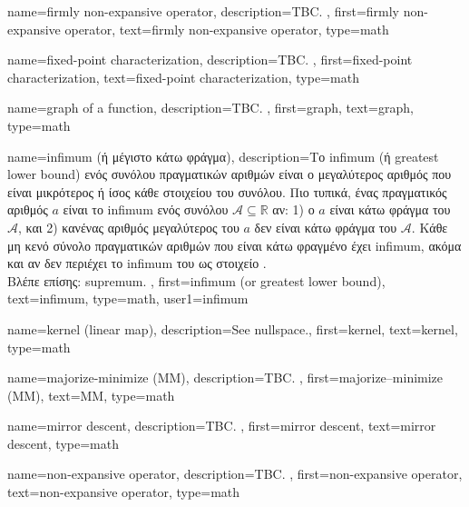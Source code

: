 {name={firmly non-expansive operator},
 	description={TBC. },
	first={firmly non-expansive operator},
 	text={firmly non-expansive operator},
	type=math
}

{name={fixed-point characterization},
	description={TBC. },
	first={fixed-point characterization},
	text={fixed-point characterization},
	type=math
}%

{name={graph of a function},
	description={TBC. }, 
	first={graph},
	text={graph},
	type=math
}

{name={infimum \foreignlanguage{greek}{(ή μέγιστο κάτω φράγμα)}},
	description={\foreignlanguage{greek}{Το} infimum 
		(\foreignlanguage{greek}{ή} greatest lower bound) \foreignlanguage{greek}{ενός συνόλου πραγματικών αριθμών είναι 
		ο μεγαλύτερος αριθμός που εί\-ναι μικρότερος ή ίσος κάθε στοιχείου του συνόλου. Πιο τυπικά, ένας πραγματικός αριθμός 
		$a$ είναι το} infimum \foreignlanguage{greek}{ενός συνόλου $\mathcal{A} \subseteq \mathbb{R}$ αν: 1) ο $a$ 
		είναι κάτω φράγμα του $\mathcal{A}$, και 2) κανένας αριθμός μεγαλύτερος του $a$ δεν είναι κάτω φράγμα του $\mathcal{A}$. 
		Κάθε μη κενό σύνολο πραγματικών αριθμών που είναι κάτω φραγμένο έχει} infimum, \foreignlanguage{greek}{ακόμα και αν δεν περιέχει 
		το} infimum \foreignlanguage{greek}{του ως στοιχείο} \cite[\foreignlanguage{greek}{Ενότητα}~1.4]{RudinBookPrinciplesMatheAnalysis}.
		\\
		\foreignlanguage{greek}{Βλέπε επίσης:} \gls{supremum}. },
	first={infimum (or greatest lower bound)},
	text={infimum},
	type=math,
	user1={infimum}
}

{name={kernel (linear map)}, 
 	description={See \gls{nullspace}.},
 	first={kernel},
	text={kernel},
	type=math
}

{name={majorize-minimize (MM)}, 
	description={TBC. },
	first={majorize–minimize (MM)},
	text={MM},
	type=math
}

{name={mirror descent},
 	description={TBC. },
 	first={mirror descent},
 	text={mirror descent},
	type=math
 }

{name={non-expansive operator},
 	description={TBC. },
	first={non-expansive operator},
 	text={non-expansive operator},
	type=math
}

